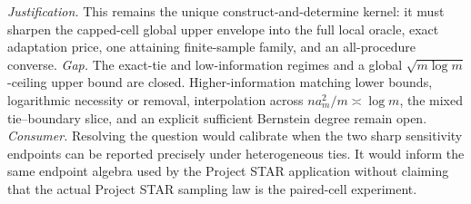 \documentclass{article}
\begin{document}
\par\smallskip\noindent \textit{Justification.} This remains the unique construct-and-determine kernel: it must sharpen the capped-cell global upper envelope into the full local oracle, exact adaptation price, one attaining finite-sample family, and an all-procedure converse. \textit{Gap.} The exact-tie and low-information regimes and a global \(\sqrt{m\log m}\)-ceiling upper bound are closed. Higher-information matching lower bounds, logarithmic necessity or removal, interpolation across \(na_m^2/m\asymp\log m\), the mixed tie--boundary slice, and an explicit sufficient Bernstein degree remain open. \textit{Consumer.} Resolving the question would calibrate when the two sharp sensitivity endpoints can be reported precisely under heterogeneous ties. It would inform the same endpoint algebra used by the Project STAR application without claiming that the actual Project STAR sampling law is the paired-cell experiment.
\end{document}
